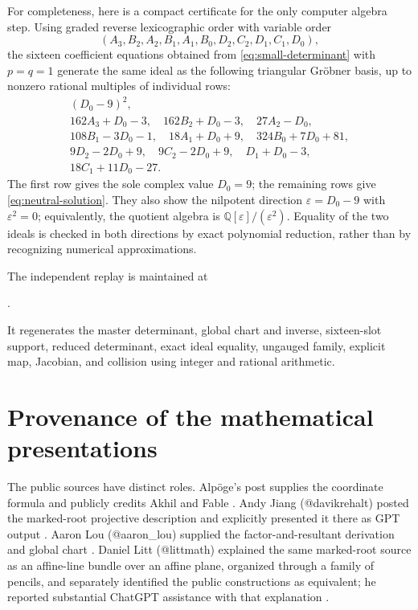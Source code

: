 \documentclass[11pt,a4paper]{article}
\numberwithin{equation}{section}
\theoremstyle{definition}
\theoremstyle{remark}
\newcommand{\Q}{\mathbb Q}
\begin{document}
For completeness, here is a compact certificate for the only computer
algebra step.  Using graded reverse lexicographic order with variable order
\[
(A_3,B_2,A_2,B_1,A_1,B_0,D_2,C_2,D_1,C_1,D_0),
\]
the sixteen coefficient equations obtained from
\eqref{eq:small-determinant} with \(p=q=1\) generate the same ideal as the
following triangular Gr\"obner basis, up to nonzero rational multiples of
individual rows:
\begin{equation}\label{eq:triangular-basis}
\begin{gathered}
(D_0-9)^2,\\
162A_3+D_0-3,
\quad 162B_2+D_0-3,
\quad 27A_2-D_0,\\
108B_1-3D_0-1,
\quad 18A_1+D_0+9,
\quad 324B_0+7D_0+81,\\
9D_2-2D_0+9,
\quad 9C_2-2D_0+9,
\quad D_1+D_0-3,\\
18C_1+11D_0-27.
\end{gathered}
\end{equation}
The first row gives the sole complex value \(D_0=9\); the remaining rows
give \eqref{eq:neutral-solution}.  They also show the nilpotent direction
\(\varepsilon=D_0-9\) with \(\varepsilon^2=0\); equivalently, the quotient
algebra is \(\Q[\varepsilon]/(\varepsilon^2)\).  Equality of the two ideals is
checked in both directions by exact polynomial reduction, rather than by
recognizing numerical approximations.

The independent replay is maintained at
\begin{center}
\small
{}.
\end{center}
It regenerates the master determinant, global chart and inverse, sixteen-slot
support, reduced determinant, exact ideal equality, ungauged family, explicit
map, Jacobian, and collision using integer and rational arithmetic.

\section{Provenance of the mathematical presentations}

The public sources have distinct roles.  Alp\"oge's post supplies the
coordinate formula and publicly credits Akhil and Fable \cite{Alpoge}.  Andy
Jiang (@davikrehalt) posted the marked-root projective description and
explicitly presented it there as GPT output \cite{Jiang}.  Aaron Lou
(@aaron\_lou) supplied the factor-and-resultant derivation and global chart
\cite{Lou}.  Daniel Litt (@littmath) explained the same marked-root source as
an affine-line bundle over an affine plane, organized through a family of
pencils, and separately identified the public constructions as equivalent;
he reported substantial ChatGPT assistance with that explanation
\cite{LittBundle,LittComparison}.
\end{document}

